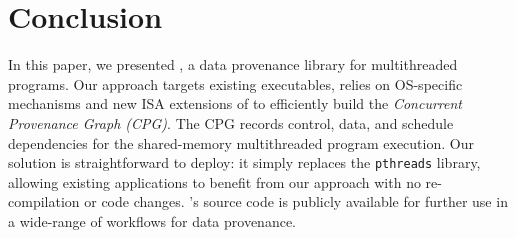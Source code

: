 \section{Conclusion}
\label{sec:conclusion}

In this paper, we presented \projecttitle, a data provenance library for multithreaded programs. Our approach targets existing executables, relies on OS-specific mechanisms and new ISA extensions of \intelpt  to efficiently build the {\em Concurrent Provenance Graph (CPG)}. The CPG records control, data, and schedule dependencies for the shared-memory multithreaded program execution. Our solution is straightforward to deploy: it simply replaces the {\tt pthreads} library, allowing existing applications to benefit from our approach with no re-compilation or code changes. \projecttitle's source code is publicly available for further use in a wide-range of workflows for data provenance. 

 
